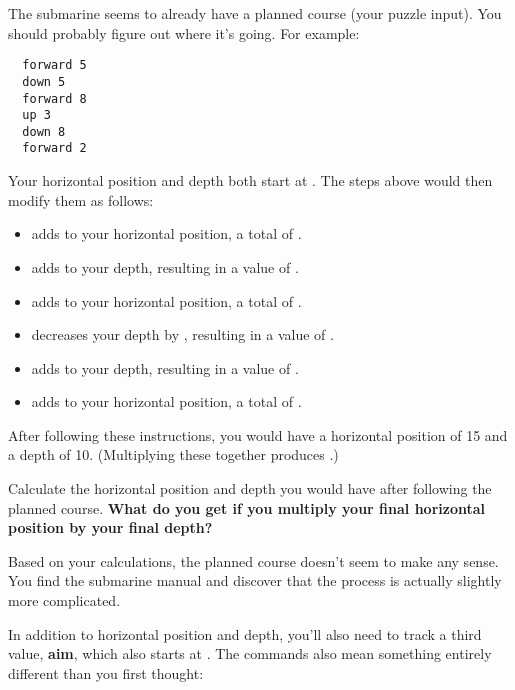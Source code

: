 The submarine seems to already have a planned course (your puzzle input). You should probably figure out where it's going. For example:
\begin{verbatim}
  forward 5
  down 5
  forward 8
  up 3
  down 8
  forward 2
\end{verbatim}

Your horizontal position and depth both start at . The steps above would then modify them as follows:
\begin{itemize}
  \item {\Tt{}\nwendquote} adds  to your horizontal position, a total of .
  \item {\Tt{}\nwendquote} adds  to your depth, resulting in a value of .
  \item {\Tt{}\nwendquote} adds  to your horizontal position, a total of .
  \item {\Tt{}\nwendquote} decreases your depth by , resulting in a value of .
  \item {\Tt{}\nwendquote} adds  to your depth, resulting in a value of .
  \item {\Tt{}\nwendquote} adds  to your horizontal position, a total of .
\end{itemize}

After following these instructions, you would have a horizontal position of 15 and a depth of 10. (Multiplying these together produces .)

Calculate the horizontal position and depth you would have after following the planned course. \textbf{What do you get if you multiply your final horizontal position by your final depth?}


Based on your calculations, the planned course doesn't seem to make any sense. You find the submarine manual and discover that the process is actually slightly more complicated.

In addition to horizontal position and depth, you'll also need to track a third value, \textbf{aim}, which also starts at . The commands also mean something entirely different than you first thought:

